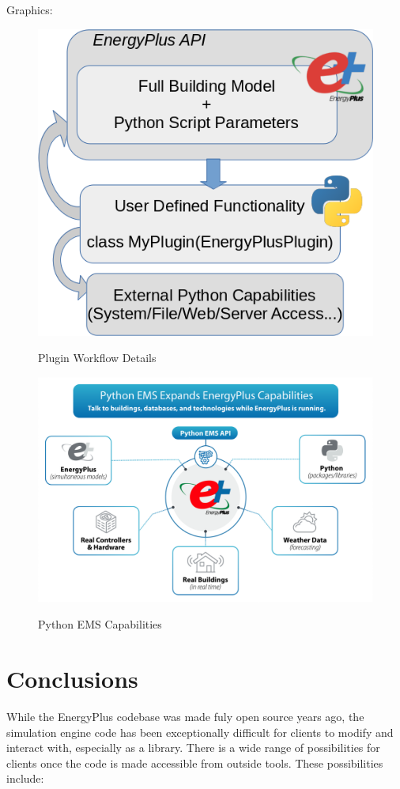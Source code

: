 \documentclass[5p, authoryear]{elsarticle}
\begin{document}
Graphics:

\begin{figure}
\begin{center}
\label{figure:plugins:plugin_workflow_cropped}
\includegraphics[width=0.7\columnwidth]{images/plugin_workflow.png}
\caption{Plugin Workflow Details}
\end{center}
\end{figure}

\begin{figure}
\begin{center}
\label{figure:plugins:python_ems}
\includegraphics[width=\columnwidth]{images/python_ems.png}
\caption{Python EMS Capabilities}
\end{center}
\end{figure}

 \section{Conclusions}
While the EnergyPlus codebase was made fuly open source years ago, the simulation engine code has been exceptionally difficult for clients to modify and interact with, especially as a library.  There is a wide range of possibilities for clients once the code is made accessible from outside tools.  These possibilities include:
\end{document}
